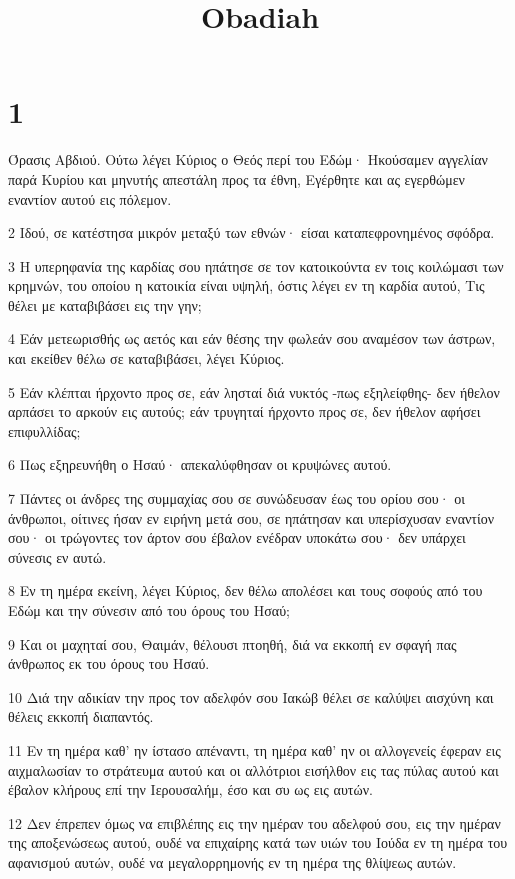 

\title{Obadiah}


\chapter{1}

\par Όρασις Αβδιού. Ούτω λέγει Κύριος ο Θεός περί του Εδώμ· Ηκούσαμεν αγγελίαν παρά Κυρίου και μηνυτής απεστάλη προς τα έθνη, Εγέρθητε και ας εγερθώμεν εναντίον αυτού εις πόλεμον.
\par 2 Ιδού, σε κατέστησα μικρόν μεταξύ των εθνών· είσαι καταπεφρονημένος σφόδρα.
\par 3 Η υπερηφανία της καρδίας σου ηπάτησε σε τον κατοικούντα εν τοις κοιλώμασι των κρημνών, του οποίου η κατοικία είναι υψηλή, όστις λέγει εν τη καρδία αυτού, Τις θέλει με καταβιβάσει εις την γην;
\par 4 Εάν μετεωρισθής ως αετός και εάν θέσης την φωλεάν σου αναμέσον των άστρων, και εκείθεν θέλω σε καταβιβάσει, λέγει Κύριος.
\par 5 Εάν κλέπται ήρχοντο προς σε, εάν λησταί διά νυκτός -πως εξηλείφθης- δεν ήθελον αρπάσει το αρκούν εις αυτούς; εάν τρυγηταί ήρχοντο προς σε, δεν ήθελον αφήσει επιφυλλίδας;
\par 6 Πως εξηρευνήθη ο Ησαύ· απεκαλύφθησαν οι κρυψώνες αυτού.
\par 7 Πάντες οι άνδρες της συμμαχίας σου σε συνώδευσαν έως του ορίου σου· οι άνθρωποι, οίτινες ήσαν εν ειρήνη μετά σου, σε ηπάτησαν και υπερίσχυσαν εναντίον σου· οι τρώγοντες τον άρτον σου έβαλον ενέδραν υποκάτω σου· δεν υπάρχει σύνεσις εν αυτώ.
\par 8 Εν τη ημέρα εκείνη, λέγει Κύριος, δεν θέλω απολέσει και τους σοφούς από του Εδώμ και την σύνεσιν από του όρους του Ησαύ;
\par 9 Και οι μαχηταί σου, Θαιμάν, θέλουσι πτοηθή, διά να εκκοπή εν σφαγή πας άνθρωπος εκ του όρους του Ησαύ.
\par 10 Διά την αδικίαν την προς τον αδελφόν σου Ιακώβ θέλει σε καλύψει αισχύνη και θέλεις εκκοπή διαπαντός.
\par 11 Εν τη ημέρα καθ' ην ίστασο απέναντι, τη ημέρα καθ' ην οι αλλογενείς έφεραν εις αιχμαλωσίαν το στράτευμα αυτού και οι αλλότριοι εισήλθον εις τας πύλας αυτού και έβαλον κλήρους επί την Ιερουσαλήμ, έσο και συ ως εις αυτών.
\par 12 Δεν έπρεπεν όμως να επιβλέπης εις την ημέραν του αδελφού σου, εις την ημέραν της αποξενώσεως αυτού, ουδέ να επιχαίρης κατά των υιών του Ιούδα εν τη ημέρα του αφανισμού αυτών, ουδέ να μεγαλορρημονής εν τη ημέρα της θλίψεως αυτών.
